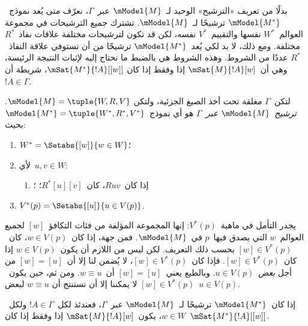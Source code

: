 \documentclass[../../../include/open-logic-section]{subfiles}
\begin{document}


بدلًا من تعريف «الترشيح» الوحيد لـ~$\mModel{M}$ عبر~$\Gamma$، نعرّف متى
يُعد نموذج~$\mModel{M^*}$ ترشيحًا لـ~$\mModel{M}$. تشترك جميع
الترشيحات في مجموعة العوالم~$W^*$ نفسها والتقييم~$V^*$ نفسه، لكن قد تكون
  لترشيحات مختلفة علاقات نفاذ~$R^*$ مختلفة. ومع ذلك، لا بد لكي
  يُعد~$\mModel{M^*}$ ترشيحًا من أن تستوفي علاقة النفاذ~$R^*$ عددًا
  من الشروط. وهذه الشروط هي بالضبط ما نحتاج إليه
لإثبات النتيجة الرئيسة، وهي أن~$\mSat{M}{!A}[w]$ إذا وفقط إذا كان
$\mSat{M^*}{!A}[{[w]}]$، شريطة أن~$!A \in \Gamma$.

\begin{defn}
  لتكن~$\Gamma$ مغلقة تحت أخذ الصيغ الجزئية، ولتكن
  $\mModel{M}=\tuple{W,R,V}$. \emph{ترشيح~$\mModel{M}$ عبر~$\Gamma$}
  هو أي نموذج~$\mModel{M^*}=\tuple{W^*,R^*,V^*}$ بحيث:
  \begin{enumerate}
  \item $W^*=\Setabs{[w]}{w \in W}$؛
  \item {}%
    لأي~$u,v \in W$:
    \begin{enumerate}
    \item {}%
      إذا كان~$Ruv$، كان~$R^*[u][v]$؛
    ؛
    \end{enumerate}
  \item $V^*(p)=\Setabs{[u]}{u \in V(p)}$.
  \end{enumerate}
\end{defn}

يجدر التأمل في ماهية~$V^*(p)$: إنها المجموعة المؤلفة من فئات
التكافؤ~$[w]$ لجميع العوالم~$w$ التي يصدق فيها~$p$ في~$\mModel{M}$.
فمن جهة، إذا كان~$w \in V(p)$، كان~$[w] \in V^*(p)$ بحسب ذلك التعريف.
لكن ليس من اللازم أن يكون~$w \in V(p)$ إذا كان~$[w] \in V^*(p)$.
فإذا كان~$[w] \in V^*(p)$، لا يُضمن لنا إلا أن~$[w]=[u]$ من أجل
\emph{بعض}~$u \in V(p)$. وبالطبع يعني~$[w]=[u]$ أن~$w \equiv u$.
ومن ثم، حين يكون~$[w] \in V^*(p)$ لا يمكننا إلا أن نستنتج أن
$w \equiv u$ لبعض~$u \in V(p)$.

\begin{thm}
  إذا كان~$\mModel{M^*}$ ترشيحًا لـ~$\mModel{M}$ عبر~$\Gamma$، فعندئذ
  لكل~$!A \in \Gamma$ ولكل~$w \in W$، يكون~$\mSat{M}{!A}[w]$ إذا
  وفقط إذا كان~$\mSat{M^*}{!A}[{[w]}]$.
\end{thm}
\end{document}
